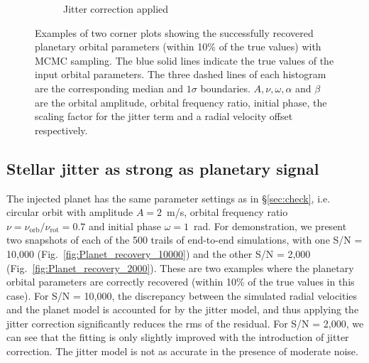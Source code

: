 \begin{figure}[tbp]
\begin{subfigure}[b]{0.49\textwidth}
        \caption{Jitter correction applied}
    \end{subfigure}	
    \caption[Corner plots of MCMC]
    {Examples of two corner plots showing the successfully recovered planetary orbital parameters (within 10\% of the true values) with MCMC sampling. The blue solid lines indicate the true values of the input orbital parameters. The three dashed lines of each histogram are the corresponding median and $1\sigma$ boundaries. $A, \nu, \omega, \alpha$ and $\beta$ are the orbital amplitude, orbital frequency ratio, initial phase, the scaling factor for the jitter term and a radial velocity offset respectively.}
\label{fig:Corner}
\end{figure}    

\subsection{Stellar jitter as strong as planetary signal}

The injected planet has the same parameter settings as in \S\ref{sec:check}, i.e. circular orbit with amplitude $A = 2$~m/s, orbital frequency ratio $\nu = \nu_\text{orb}/\nu_\text{rot}= 0.7$ and initial phase $\omega = 1$~rad. For demonstration, we present two snapshots of each of the 500 trails of end-to-end simulations, with one S/N = 10,000 (Fig.~\ref{fig:Planet_recovery_10000}) and the other S/N = 2,000 (Fig.~\ref{fig:Planet_recovery_2000}). These are two examples where the planetary orbital parameters are correctly recovered (within 10\% of the true values in this case). For S/N = 10,000, the discrepancy between the simulated radial velocities and the planet model is accounted for by the jitter model, and thus applying the jitter correction significantly reduces the rms of the residual. For S/N = 2,000, we can see that the fitting is only slightly improved with the introduction of jitter correction. The jitter model is not as accurate in the presence of moderate noise. 

